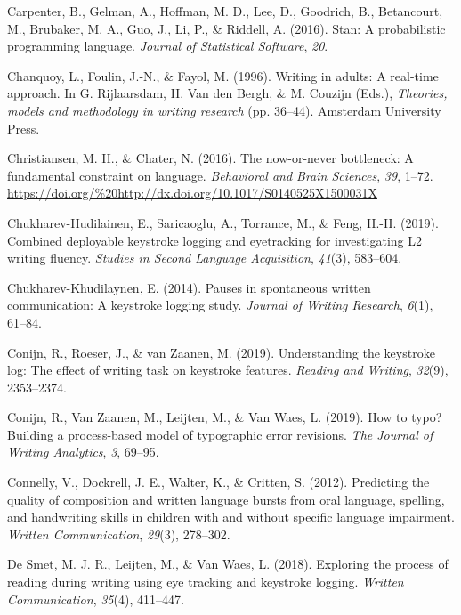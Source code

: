\documentclass[
  english,
  man,mask,floatsintext]{apa7}
\newlength{\cslhangindent}
\newenvironment{cslreferences}%
  {\setlength{\parindent}{0pt}%
  \everypar{\setlength{\hangindent}{\cslhangindent}}\ignorespaces}%
  {\par}
\begin{document}
\begin{cslreferences}
\leavevmode\hypertarget{ref-carpenter2016stan}{}%
Carpenter, B., Gelman, A., Hoffman, M. D., Lee, D., Goodrich, B., Betancourt, M., Brubaker, M. A., Guo, J., Li, P., \& Riddell, A. (2016). Stan: A probabilistic programming language. \emph{Journal of Statistical Software}, \emph{20}.

\leavevmode\hypertarget{ref-chanquoy1996writing}{}%
Chanquoy, L., Foulin, J.-N., \& Fayol, M. (1996). Writing in adults: A real-time approach. In G. Rijlaarsdam, H. Van den Bergh, \& M. Couzijn (Eds.), \emph{Theories, models and methodology in writing research} (pp. 36--44). Amsterdam University Press.

\leavevmode\hypertarget{ref-christiansen2016now}{}%
Christiansen, M. H., \& Chater, N. (2016). The now-or-never bottleneck: A fundamental constraint on language. \emph{Behavioral and Brain Sciences}, \emph{39}, 1--72. \url{https://doi.org/\%20http://dx.doi.org/10.1017/S0140525X1500031X}

\leavevmode\hypertarget{ref-chukharev2019combined}{}%
Chukharev-Hudilainen, E., Saricaoglu, A., Torrance, M., \& Feng, H.-H. (2019). Combined deployable keystroke logging and eyetracking for investigating L2 writing fluency. \emph{Studies in Second Language Acquisition}, \emph{41}(3), 583--604.

\leavevmode\hypertarget{ref-chukharev2014pauses}{}%
Chukharev-Khudilaynen, E. (2014). Pauses in spontaneous written communication: A keystroke logging study. \emph{Journal of Writing Research}, \emph{6}(1), 61--84.

\leavevmode\hypertarget{ref-conijn2019understanding}{}%
Conijn, R., Roeser, J., \& van Zaanen, M. (2019). Understanding the keystroke log: The effect of writing task on keystroke features. \emph{Reading and Writing}, \emph{32}(9), 2353--2374.

\leavevmode\hypertarget{ref-conijn2019typo}{}%
Conijn, R., Van Zaanen, M., Leijten, M., \& Van Waes, L. (2019). How to typo? Building a process-based model of typographic error revisions. \emph{The Journal of Writing Analytics}, \emph{3}, 69--95.

\leavevmode\hypertarget{ref-connelly2012predicting}{}%
Connelly, V., Dockrell, J. E., Walter, K., \& Critten, S. (2012). Predicting the quality of composition and written language bursts from oral language, spelling, and handwriting skills in children with and without specific language impairment. \emph{Written Communication}, \emph{29}(3), 278--302.

\leavevmode\hypertarget{ref-de2018exploring}{}%
De Smet, M. J. R., Leijten, M., \& Van Waes, L. (2018). Exploring the process of reading during writing using eye tracking and keystroke logging. \emph{Written Communication}, \emph{35}(4), 411--447.


\end{cslreferences}
\end{document}
